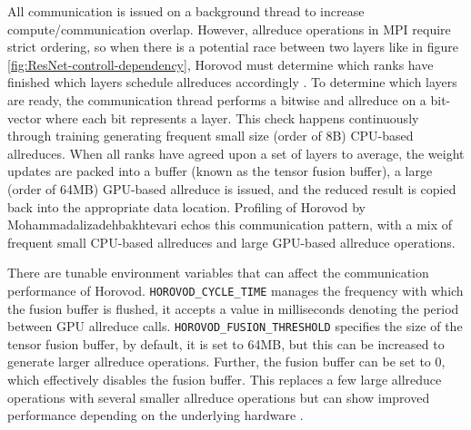 All communication is issued on a background thread to increase compute/communication overlap.
However, allreduce operations in MPI require strict ordering, so when there is a potential race between two layers like in figure \ref{fig:ResNet-controll-dependency}, Horovod must determine which ranks have finished which layers schedule allreduces accordingly \cite{Kurth2019TFatScaleAnalysisOfHvdAndCPEML}.  
To determine which layers are ready, the communication thread performs a bitwise and allreduce on a bit-vector where each bit represents a layer.
This check happens continuously through training generating frequent small size (order of 8B) CPU-based allreduces.
When all ranks have agreed upon a set of layers to average, the weight updates are packed into a buffer (known as the tensor fusion buffer), a large (order of 64MB) GPU-based allreduce is issued, and the reduced result is copied back into the appropriate data location.
Profiling of Horovod by Mohammadalizadehbakhtevari \cite{Mohammadalizadehbakhtevari2021Thesis} echos this communication pattern, with a mix of frequent small CPU-based allreduces and large GPU-based allreduce operations.

There are tunable environment variables that can affect the communication performance of Horovod.
\texttt{HOROVOD\_CYCLE\_TIME} manages the frequency with which the fusion buffer is flushed, it accepts a value in milliseconds denoting the period between GPU allreduce calls.
\texttt{HOROVOD\_FUSION\_THRESHOLD} specifies the size of the tensor fusion buffer, by default, it is set to 64MB, but this can be increased to generate larger allreduce operations.
Further, the fusion buffer can be set to 0, which effectively disables the fusion buffer.
This replaces a few large allreduce operations with several smaller allreduce operations but can show improved performance depending on the underlying hardware \cite{Awan2019CommProfDLonClusters}.

\clearpage